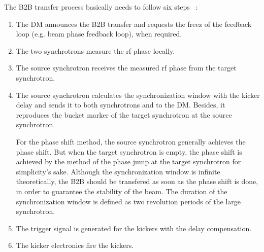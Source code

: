 The B2B transfer process basically needs to follow six steps ~\cite{bai_bunch_2015}:
\begin{enumerate}
\item The DM announces the B2B transfer and requests the freez of the feedback loop (e.g. beam phase feedback loop), when required.
\item The two synchrotrons measure the rf phase locally.
\item The source synchrotron receives the measured rf phase from the target synchrotron.
\item The source synchrotron calculates the synchronization window with the kicker delay and sends it to both synchrotrons and to the DM. Besides, it reproduces the bucket marker of the target synchrotron at the source synchrotron.

For the phase shift method, the source synchrotron generally achieves the phase shift. But when the target synchrotron is empty, the phase shift is achieved by the method of the phase jump at the target synchrotron for simplicity's sake. Although the synchronization window is infinite theoretically, the B2B should be transfered as soon as the phase shift is done, in order to guarantee the stability of the beam. The duration of the synchronization window is defined as two revolution periods of the large synchrotron. 
\item The trigger signal is generated for the kickers with the delay compensation.
\item The kicker electronics fire the kickers.
\end{enumerate}



